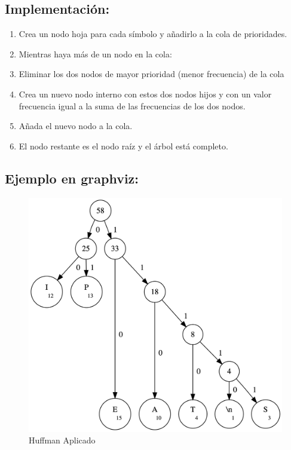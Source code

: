 \documentclass[]{article}
\begin{document}
	\subsection{Implementación:}
		\begin{enumerate}
			\item Crea un nodo hoja para cada símbolo y añadirlo a la cola de prioridades.
			\item Mientras haya más de un nodo en la cola:
			\item Eliminar los dos nodos de mayor prioridad (menor frecuencia) de la cola
			\item Crea un nuevo nodo interno con estos dos nodos hijos y con un valor frecuencia igual a la suma de las frecuencias de los dos nodos.
			\item Añada el nuevo nodo a la cola.
			\item El nodo restante es el nodo raíz y el árbol está completo.
		\end{enumerate}
	\subsection{Ejemplo en graphviz:}
	\begin{figure}[H]
		\centering\includegraphics[width=\textwidth]{graphviz/huffman.png}
		\caption{Huffman Aplicado}
		\label{fig:Huffman Aplicado}
	\end{figure}
\end{document}
